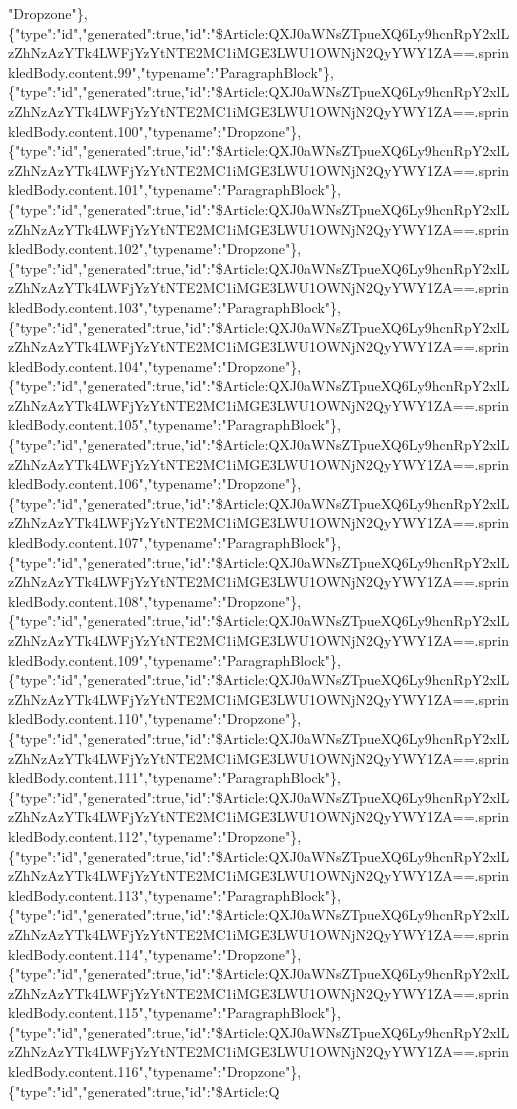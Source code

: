 "Dropzone"\},\{"type":"id","generated":true,"id":"\$Article:QXJ0aWNsZTpueXQ6Ly9hcnRpY2xlLzZhNzAzYTk4LWFjYzYtNTE2MC1iMGE3LWU1OWNjN2QyYWY1ZA==.sprinkledBody.content.99","typename":"ParagraphBlock"\},\{"type":"id","generated":true,"id":"\$Article:QXJ0aWNsZTpueXQ6Ly9hcnRpY2xlLzZhNzAzYTk4LWFjYzYtNTE2MC1iMGE3LWU1OWNjN2QyYWY1ZA==.sprinkledBody.content.100","typename":"Dropzone"\},\{"type":"id","generated":true,"id":"\$Article:QXJ0aWNsZTpueXQ6Ly9hcnRpY2xlLzZhNzAzYTk4LWFjYzYtNTE2MC1iMGE3LWU1OWNjN2QyYWY1ZA==.sprinkledBody.content.101","typename":"ParagraphBlock"\},\{"type":"id","generated":true,"id":"\$Article:QXJ0aWNsZTpueXQ6Ly9hcnRpY2xlLzZhNzAzYTk4LWFjYzYtNTE2MC1iMGE3LWU1OWNjN2QyYWY1ZA==.sprinkledBody.content.102","typename":"Dropzone"\},\{"type":"id","generated":true,"id":"\$Article:QXJ0aWNsZTpueXQ6Ly9hcnRpY2xlLzZhNzAzYTk4LWFjYzYtNTE2MC1iMGE3LWU1OWNjN2QyYWY1ZA==.sprinkledBody.content.103","typename":"ParagraphBlock"\},\{"type":"id","generated":true,"id":"\$Article:QXJ0aWNsZTpueXQ6Ly9hcnRpY2xlLzZhNzAzYTk4LWFjYzYtNTE2MC1iMGE3LWU1OWNjN2QyYWY1ZA==.sprinkledBody.content.104","typename":"Dropzone"\},\{"type":"id","generated":true,"id":"\$Article:QXJ0aWNsZTpueXQ6Ly9hcnRpY2xlLzZhNzAzYTk4LWFjYzYtNTE2MC1iMGE3LWU1OWNjN2QyYWY1ZA==.sprinkledBody.content.105","typename":"ParagraphBlock"\},\{"type":"id","generated":true,"id":"\$Article:QXJ0aWNsZTpueXQ6Ly9hcnRpY2xlLzZhNzAzYTk4LWFjYzYtNTE2MC1iMGE3LWU1OWNjN2QyYWY1ZA==.sprinkledBody.content.106","typename":"Dropzone"\},\{"type":"id","generated":true,"id":"\$Article:QXJ0aWNsZTpueXQ6Ly9hcnRpY2xlLzZhNzAzYTk4LWFjYzYtNTE2MC1iMGE3LWU1OWNjN2QyYWY1ZA==.sprinkledBody.content.107","typename":"ParagraphBlock"\},\{"type":"id","generated":true,"id":"\$Article:QXJ0aWNsZTpueXQ6Ly9hcnRpY2xlLzZhNzAzYTk4LWFjYzYtNTE2MC1iMGE3LWU1OWNjN2QyYWY1ZA==.sprinkledBody.content.108","typename":"Dropzone"\},\{"type":"id","generated":true,"id":"\$Article:QXJ0aWNsZTpueXQ6Ly9hcnRpY2xlLzZhNzAzYTk4LWFjYzYtNTE2MC1iMGE3LWU1OWNjN2QyYWY1ZA==.sprinkledBody.content.109","typename":"ParagraphBlock"\},\{"type":"id","generated":true,"id":"\$Article:QXJ0aWNsZTpueXQ6Ly9hcnRpY2xlLzZhNzAzYTk4LWFjYzYtNTE2MC1iMGE3LWU1OWNjN2QyYWY1ZA==.sprinkledBody.content.110","typename":"Dropzone"\},\{"type":"id","generated":true,"id":"\$Article:QXJ0aWNsZTpueXQ6Ly9hcnRpY2xlLzZhNzAzYTk4LWFjYzYtNTE2MC1iMGE3LWU1OWNjN2QyYWY1ZA==.sprinkledBody.content.111","typename":"ParagraphBlock"\},\{"type":"id","generated":true,"id":"\$Article:QXJ0aWNsZTpueXQ6Ly9hcnRpY2xlLzZhNzAzYTk4LWFjYzYtNTE2MC1iMGE3LWU1OWNjN2QyYWY1ZA==.sprinkledBody.content.112","typename":"Dropzone"\},\{"type":"id","generated":true,"id":"\$Article:QXJ0aWNsZTpueXQ6Ly9hcnRpY2xlLzZhNzAzYTk4LWFjYzYtNTE2MC1iMGE3LWU1OWNjN2QyYWY1ZA==.sprinkledBody.content.113","typename":"ParagraphBlock"\},\{"type":"id","generated":true,"id":"\$Article:QXJ0aWNsZTpueXQ6Ly9hcnRpY2xlLzZhNzAzYTk4LWFjYzYtNTE2MC1iMGE3LWU1OWNjN2QyYWY1ZA==.sprinkledBody.content.114","typename":"Dropzone"\},\{"type":"id","generated":true,"id":"\$Article:QXJ0aWNsZTpueXQ6Ly9hcnRpY2xlLzZhNzAzYTk4LWFjYzYtNTE2MC1iMGE3LWU1OWNjN2QyYWY1ZA==.sprinkledBody.content.115","typename":"ParagraphBlock"\},\{"type":"id","generated":true,"id":"\$Article:QXJ0aWNsZTpueXQ6Ly9hcnRpY2xlLzZhNzAzYTk4LWFjYzYtNTE2MC1iMGE3LWU1OWNjN2QyYWY1ZA==.sprinkledBody.content.116","typename":"Dropzone"\},\{"type":"id","generated":true,"id":"\$Article:Q